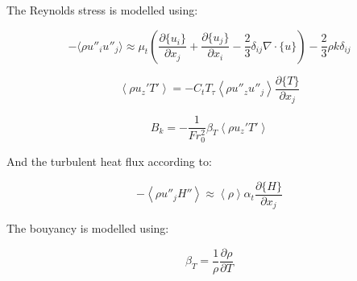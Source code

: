 \documentclass[paper=a4, fontsize=12pt]{scrartcl} %
\newcommand{\rave}[1]{\left<{#1}\right>}
\newcommand{\fave}[1]{\{{#1}\}}
\newcommand{\pd}{\partial }
\newcommand{\fpd}[2]{\frac{\partial #1}{\partial {#2}}}
\begin{document}
The Reynolds stress is modelled using:

\begin{equation}
-\langle \rho u''_i u''_j \rangle \approx \mu_t \left(\fpd{\fave{u_i}}{x_j} +\fpd{\fave{u_j}}{x_i} - \frac{2}{3}\delta_{ij} \nabla \cdot \fave{u} \right) - \frac{2}{3} \rho k \delta_{ij}
\end{equation}

\begin{equation}
\rave{\rho u_z'T' } = -C_t T_\tau \rave{\rho u''_z u''_j}\fpd{\fave{T}}{x_j}
\end{equation}

\begin{equation}
B_k = -\frac{1}{Fr_0^2}\beta_T  \rave{\rho u_z'T' }
\end{equation}



And the turbulent heat flux according to:

\begin{equation}
-\rave{ \rho u''_j H''} \approx \rave{\rho} \alpha_t \fpd{\fave H}{x_j}
\end{equation}

The bouyancy is modelled using:


\begin{equation}
\beta_T = \frac{1}{\rho}\frac{\pd \rho}{\pd T}
\end{equation}
\end{document}
